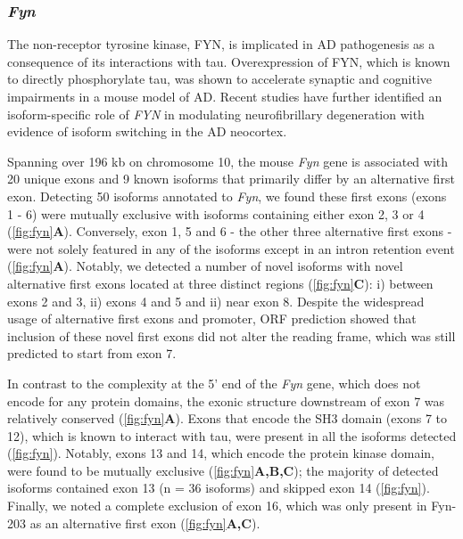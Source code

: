 \newpage
\subsubsection{\textit{Fyn}}
The non-receptor tyrosine kinase, FYN, is implicated in AD pathogenesis as a consequence of its interactions with tau\cite{Bhaskar2010}. Overexpression of FYN, which is known to directly phosphorylate tau\cite{Bhaskar2010}, was shown to accelerate synaptic and cognitive impairments in a mouse model of AD\cite{Chin2005}. Recent studies have further identified an isoform-specific role of \textit{FYN} in modulating neurofibrillary degeneration with evidence of isoform switching in the AD neocortex\cite{Lee2016b}. 

Spanning over 196 kb on chromosome 10, the mouse \textit{Fyn} gene is associated with 20 unique exons and 9 known isoforms that primarily differ by an alternative first exon. Detecting 50 isoforms annotated to \textit{Fyn}, we found these first exons (exons 1 - 6) were mutually exclusive with isoforms containing either exon 2, 3 or 4 (\cref{fig:fyn}\textbf{A}). Conversely, exon 1, 5 and 6 - the other three alternative first exons - were not solely featured in any of the isoforms except in an intron retention event (\cref{fig:fyn}\textbf{A}). Notably, we detected a number of novel isoforms with novel alternative first exons located at three distinct regions (\cref{fig:fyn}\textbf{C}): i) between exons 2 and 3, ii) exons 4 and 5 and ii) near exon 8. Despite the widespread usage of alternative first exons and promoter, ORF prediction showed that inclusion of these novel first exons did not alter the reading frame, which was still predicted to start from exon 7.  

In contrast to the complexity at the 5' end of the \textit{Fyn} gene, which does not encode for any protein domains, the exonic structure downstream of exon 7 was relatively conserved (\cref{fig:fyn}\textbf{A}). Exons that encode the SH3 domain (exons 7 to 12), which is known to interact with tau, were present in all the isoforms detected (\cref{fig:fyn}). Notably, exons 13 and 14, which encode the protein kinase domain, were found to be mutually exclusive (\cref{fig:fyn}\textbf{A,B,C}); the majority of detected isoforms contained exon 13 (n = 36 isoforms) and skipped exon 14 (\cref{fig:fyn}). Finally, we noted a complete exclusion of exon 16, which was only present in Fyn-203 as an alternative first exon (\cref{fig:fyn}\textbf{A,C}). 

